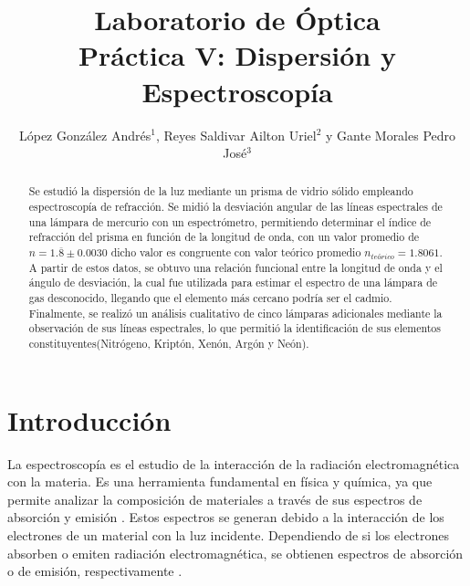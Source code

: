 \documentclass[article,12pt]{elsarticle}
\begin{document}

\begin{frontmatter}
    \title{Laboratorio de Óptica \\  Práctica  V: Dispersión y Espectroscopía}
    \author{López González Andrés$^1$, Reyes Saldivar Ailton Uriel$^2$ y Gante Morales Pedro José$^3$} %
    \address{$^1$ Facultad de Ciencias, Universidad Nacional Autónoma de México, M\'exico CDMX.}

\begin{abstract}
Se estudió la dispersión de la luz mediante un prisma de vidrio sólido empleando espectroscopía de refracción. Se midió la desviación angular de las líneas espectrales de una lámpara de mercurio con un espectrómetro, permitiendo determinar el índice de refracción del prisma en función de la longitud de onda, con un valor promedio de \( n = 1.\overline{8} \pm 0.0030 \) dicho valor es congruente con valor teórico promedio $n_{teórico}=1.8061$. A partir de estos datos, se obtuvo una relación funcional entre la longitud de onda y el ángulo de desviación, la cual fue utilizada para estimar el espectro de una lámpara de gas desconocido, llegando que el elemento más cercano podría ser el cadmio. Finalmente, se realizó un análisis cualitativo de cinco lámparas adicionales mediante la observación de sus líneas espectrales, lo que permitió la identificación de sus elementos constituyentes(Nitrógeno, Kriptón, Xenón, Argón y Neón).
\end{abstract}
    
\end{frontmatter}

\vspace{0.5cm} 



\section{Introducción}
La espectroscopía es el estudio de la interacción de la radiación electromagnética con la materia. Es una herramienta fundamental en física y química, ya que permite analizar la composición de materiales a través de sus espectros de absorción y emisión \cite{hecht2000optica}. Estos espectros se generan debido a la interacción de los electrones de un material con la luz incidente. Dependiendo de si los electrones absorben o emiten radiación electromagnética, se obtienen espectros de absorción o de emisión, respectivamente \cite{Pedrotti2018optics}.
\end{document}
